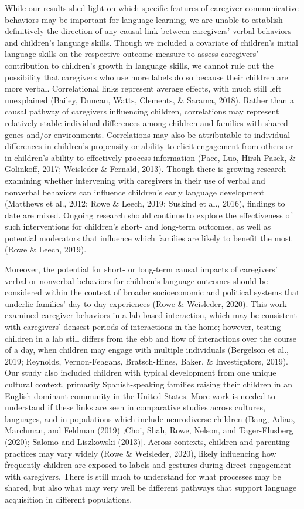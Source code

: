 \documentclass[
  english,
  man,floatsintext]{apa6}
\begin{document}
While our results shed light on which specific features of caregiver communicative behaviors may be important for language learning, we are unable to establish definitively the direction of any causal link between caregivers' verbal behaviors and children's language skills. Though we included a covariate of children's initial language skills on the respective outcome measure to assess caregivers' contribution to children's growth in language skills, we cannot rule out the possibility that caregivers who use more labels do so because their children are more verbal. Correlational links represent average effects, with much still left unexplained (Bailey, Duncan, Watts, Clements, \& Sarama, 2018). Rather than a causal pathway of caregivers influencing children, correlations may represent relatively stable individual differences among children and families with shared genes and/or environments. Correlations may also be attributable to individual differences in children's propensity or ability to elicit engagement from others or in children's ability to effectively process information (Pace, Luo, Hirsh-Pasek, \& Golinkoff, 2017; Weisleder \& Fernald, 2013). Though there is growing research examining whether intervening with caregivers in their use of verbal and nonverbal behaviors can influence children's early language development (Matthews et al., 2012; Rowe \& Leech, 2019; Suskind et al., 2016), findings to date are mixed. Ongoing research should continue to explore the effectiveness of such interventions for children's short- and long-term outcomes, as well as potential moderators that influence which families are likely to benefit the most (Rowe \& Leech, 2019).

Moreover, the potential for short- or long-term causal impacts of caregivers' verbal or nonverbal behaviors for children's language outcomes should be considered within the context of broader socioeconomic and political systems that underlie families' day-to-day experiences (Rowe \& Weisleder, 2020). This work examined caregiver behaviors in a lab-based interaction, which may be consistent with caregivers' densest periods of interactions in the home; however, testing children in a lab still differs from the ebb and flow of interactions over the course of a day, when children may engage with multiple individuals (Bergelson et al., 2019; Reynolds, Vernon-Feagans, Bratsch-Hines, Baker, \& Investigators, 2019). Our study also included children with typical development from one unique cultural context, primarily Spanish-speaking families raising their children in an English-dominant community in the United States. More work is needed to understand if these links are seen in comparative studies across cultures, languages, and in populations which include neurodiverse children (Bang, Adiao, Marchman, and Feldman (2019) ;Choi, Shah, Rowe, Nelson, and Tager-Flusberg (2020); Salomo and Liszkowski (2013){]}. Across contexts, children and parenting practices may vary widely (Rowe \& Weisleder, 2020), likely influencing how frequently children are exposed to labels and gestures during direct engagement with caregivers. There is still much to understand for what processes may be shared, but also what may very well be different pathways that support language acquisition in different populations.
\end{document}
